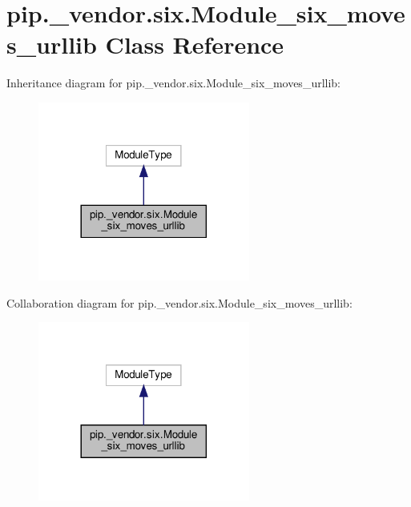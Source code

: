 \hypertarget{classpip_1_1__vendor_1_1six_1_1Module__six__moves__urllib}{}\section{pip.\+\_\+vendor.\+six.\+Module\+\_\+six\+\_\+moves\+\_\+urllib Class Reference}
\label{classpip_1_1__vendor_1_1six_1_1Module__six__moves__urllib}


Inheritance diagram for pip.\+\_\+vendor.\+six.\+Module\+\_\+six\+\_\+moves\+\_\+urllib\+:
\nopagebreak
\begin{figure}[H]
\begin{center}
\leavevmode
\includegraphics[width=197pt]{classpip_1_1__vendor_1_1six_1_1Module__six__moves__urllib__inherit__graph}
\end{center}
\end{figure}


Collaboration diagram for pip.\+\_\+vendor.\+six.\+Module\+\_\+six\+\_\+moves\+\_\+urllib\+:
\nopagebreak
\begin{figure}[H]
\begin{center}
\leavevmode
\includegraphics[width=197pt]{classpip_1_1__vendor_1_1six_1_1Module__six__moves__urllib__coll__graph}
\end{center}
\end{figure}
